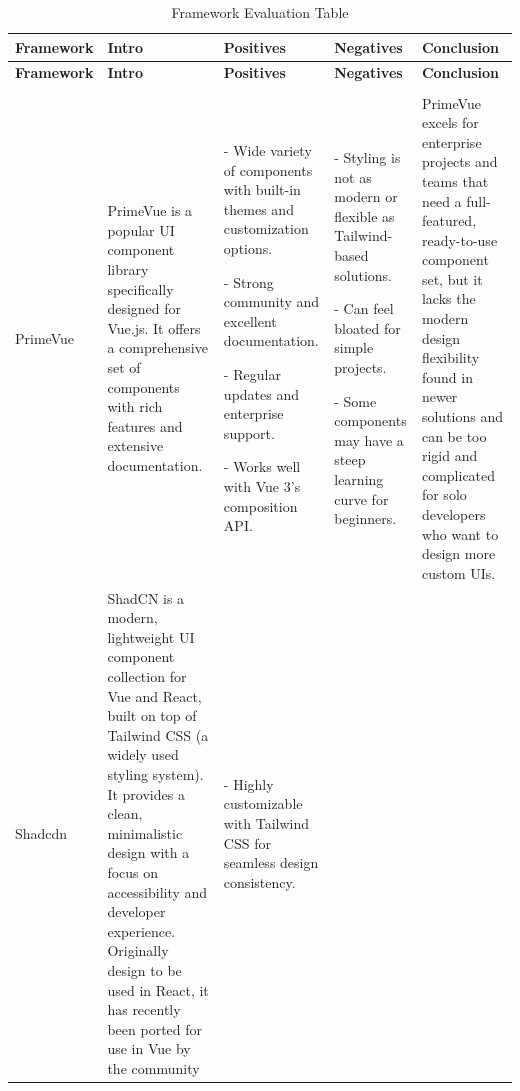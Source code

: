 \begin{longtable}{%
  >{\raggedright\arraybackslash}p{}  %
  >{\raggedright\arraybackslash}p{}  %
  >{\raggedright\arraybackslash}p{}  %
  >{\raggedright\arraybackslash}p{}  %
  >{\raggedright\arraybackslash}p{}  %
}
\caption{Framework Evaluation Table} \\
\toprule
\textbf{Framework} & \textbf{Intro} & \textbf{Positives} & \textbf{Negatives} & \textbf{Conclusion} \\
\midrule
\endfirsthead

\toprule
\textbf{Framework} & \textbf{Intro} & \textbf{Positives} & \textbf{Negatives} & \textbf{Conclusion} \\
\midrule
\endhead

\midrule
\multicolumn{5}{r}{\emph{Continued on next page}} \\
\bottomrule
\endfoot

\bottomrule
\endlastfoot


PrimeVue & 
PrimeVue is a popular UI component library specifically designed for Vue.js. It offers a comprehensive set of components with rich features and extensive documentation. &

- Wide variety of components with built-in themes and customization options.

- Strong community and excellent documentation.

- Regular updates and enterprise support.

- Works well with Vue 3’s composition API. &


- Styling is not as modern or flexible as Tailwind-based solutions.

- Can feel bloated for simple projects.

- Some components may have a steep learning curve for beginners. &

PrimeVue excels for enterprise projects and teams that need a full-featured, ready-to-use component set, but it lacks the modern design flexibility found in newer solutions and can be too rigid and complicated for solo developers who want to design more custom UIs. \\

Shadcdn & ShadCN is a modern, lightweight UI component collection for Vue and React, built on top of Tailwind CSS (a widely used styling system). It provides a clean, minimalistic design with a focus on accessibility and developer experience. Originally design to be used in React, it has recently been ported for use in Vue by the community &
 - Highly customizable with Tailwind CSS for seamless design consistency. 


\end{longtable}
